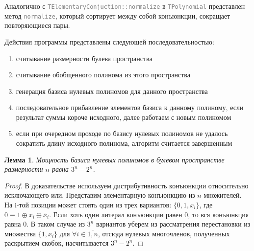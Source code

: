 \documentclass[a4paper,12pt,titlepage,finall]{article}
\newtheorem{lemma}{Лемма}
\newcommand{\code}[1]{\textcolor{gray}{\texttt{#1}}}
\begin{document}
Аналогично с \code{TElementaryConjuction::normalize} в \code{TPolynomial} представлен метод \code{normalize}, который сортирует между собой конъюнкции, сокращает повторяющиеся пары.

Действия программы представлены следующей последовательностью:
\begin{enumerate}
    \item считывание размерности булева пространства
    \item считывание обобщенного полинома из этого пространства
    \item генерация базиса нулевых полиномов для данного пространства
    \item последовательное прибавление элементов базиса к данному полиному, если результат суммы короче исходного, далее работаем с новым полиномом
    \item если при очередном проходе по базису нулевых полиномов не удалось сократить длину исходного полинома, алгоритм считается завершенным
\end{enumerate}

\begin{lemma}
    Мощность базиса нулевых полиномов в булевом пространстве размерности $n$ равна $3^n - 2^n$.
\end{lemma}
\begin{proof}
    В доказательстве используем дистрибутивность конъюнкции относительно исключающего или.
    Представим элементарную конъюнкцию из $n$ множителей. На i-той позиции может стоять один из трех вариантов: $\{0, 1, x_i \}$, где $0 \equiv 1 \oplus x_i \oplus \overline x_i$. Если хоть один литерал конъюнкции равен 0, то вся конъюнкция равна 0. В таком случае из $3^n$ вариантов уберем из рассматрения перестановки из множества $\{1, x_i \}$ для $\forall i \in \overline{1, n}$, отсюда нулевых многочленов, полученных раскрытием скобок, насчитывается $3^n - 2^n$.
\end{proof}
\end{document}
